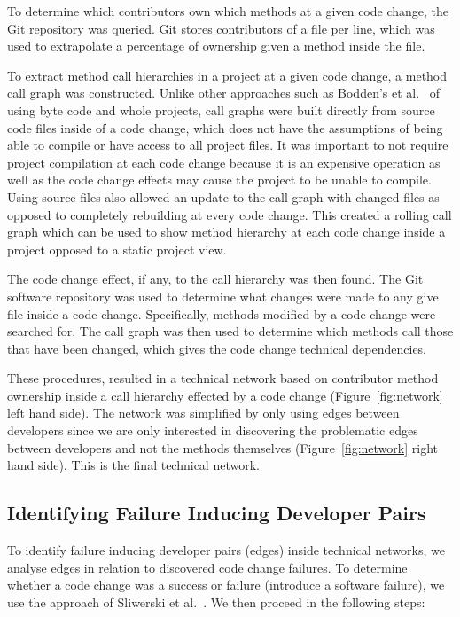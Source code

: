 \documentclass[conference]{IEEEtran}
\begin{document}
To determine which contributors own which methods at a given code change,
the Git repository was queried. Git stores contributors of a file per line, which was used to extrapolate
a percentage of ownership given a method inside the file.

To extract method call hierarchies in a project at a given code change,
a method call graph was constructed. Unlike other approaches such as Bodden's et al.~\cite{Bodden:2003:HVJ} 
of using byte code and whole projects, call graphs were built directly from source code files
inside of a code change, 
which does not have the assumptions of being able to compile or have access to all project 
files. It was important to not require project compilation at each code change because it is
an expensive operation as well as the code change effects may cause the project
to be unable to compile. Using source files also allowed an update to the call graph
with changed files as opposed to completely rebuilding at 
every code change. This created a rolling call graph which 
can be used to show method hierarchy at each code change inside a project opposed to
a static project view.

The code change effect, if any, to the call hierarchy was then found. The Git
software repository was used to determine what changes were made to any give file inside a 
code change. Specifically, methods modified by a code change were searched for. The call graph 
was then used to determine which methods call those that have been changed, which
gives the code change technical dependencies.

These procedures, resulted in a technical network based on contributor method ownership 
inside a call hierarchy effected by a code change (Figure~\ref{fig:network} left hand side).
The network was simplified by only using edges between developers since we 
are only interested in discovering the problematic edges between developers and not the 
methods themselves (Figure~\ref{fig:network} right hand side). This is the final technical 
network.

\subsection{Identifying Failure Inducing Developer Pairs}
To identify failure inducing developer pairs (edges) inside technical networks, we analyse 
edges in relation to discovered code change failures. To determine whether a code change 
was a success or failure (introduce a software failure), we use the approach of
Sliwerski et al.~\cite{Sliwerski:2005:CIF}. We then proceed in the following steps:
\end{document}
